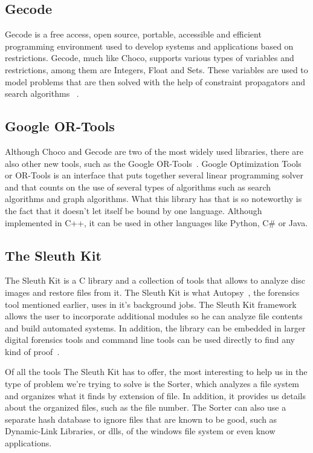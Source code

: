 \subsection{Gecode}

Gecode is a free access, open source, portable, accessible and efficient programming environment used to develop systems and applications based on restrictions. Gecode, much like Choco, supports various types of variables and restrictions, among them are Integers, Float and Sets. These variables are used to model problems that are then solved with the help of constraint propagators and search algorithms \cite{MPG:M:5.1.0}~\cite{gecode}.

\subsection{Google OR-Tools}

Although Choco and Gecode are two of the most widely used libraries, there are also other new tools, such as the Google OR-Tools~\cite{ORTools}. Google Optimization Tools or OR-Tools is an interface that puts together several linear programming solver and that counts on the use of several types of algorithms such as search algorithms and graph algorithms. What this library has that is so noteworthy is the fact that it doesn't let itself be bound by one language. Although implemented in C++, it can be used in other languages like Python, C\# or Java.

\subsection{The Sleuth Kit}

The Sleuth Kit is a C library and a collection of tools that allows to analyze disc images and restore files from it. The Sleuth Kit is what Autopsy~\cite{Autopsy}, the forensics tool mentioned earlier, uses in it's background jobs. The Sleuth Kit framework allows the user to incorporate additional modules so he can analyze file contents and build automated systems. In addition, the library can be embedded in larger digital forensics tools and command line tools can be used directly to find any kind of proof~\cite{tsk}. 

Of all the tools The Sleuth Kit has to offer, the most interesting to help us in the type of problem we're trying to solve is the Sorter, which analyzes a file system and organizes what it finds by extension of file. In addition, it provides us details about the organized files, such as the file \INODE number. The Sorter can also use a separate hash database to ignore files that are known to be good, such as Dynamic-Link Libraries, or dlls, of the windows file system or even know applications.